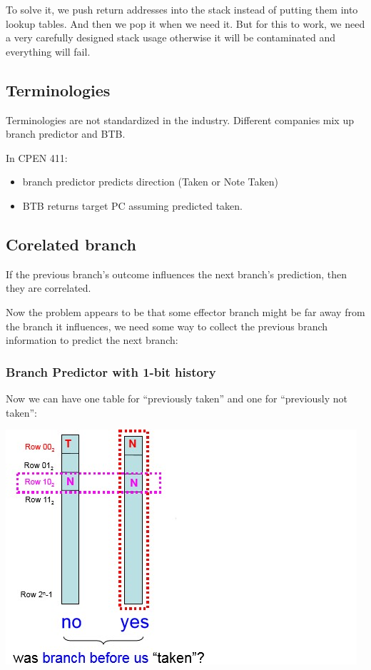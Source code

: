 \documentclass[letterpaper,12pt]{article}
\begin{document}
To solve it, we push return addresses into the stack instead of putting them into lookup tables. And then we pop it when we need it. But for this to work, we need a very carefully designed stack usage otherwise it will be contaminated and everything will fail.

\subsection{Terminologies}
Terminologies are not standardized in the industry. Different companies mix up branch predictor and BTB.

In CPEN 411:
\begin{itemize}
    \item branch predictor predicts direction (Taken or Note Taken)
    \item BTB returns target PC assuming predicted taken.
\end{itemize}

\subsection{Corelated branch}
If the previous branch's outcome influences the next branch's prediction, then they are correlated.

Now the problem appears to be that some effector branch might be far away from the branch it influences, we need some way to collect the previous branch information to predict the next branch:

\subsubsection{Branch Predictor with 1-bit history}
Now we can have one table for ``previously taken'' and one for ``previously not taken'':

\includegraphics*[scale = 0.7]{./Image/one bit correlated branch example.jpg}
\end{document}
